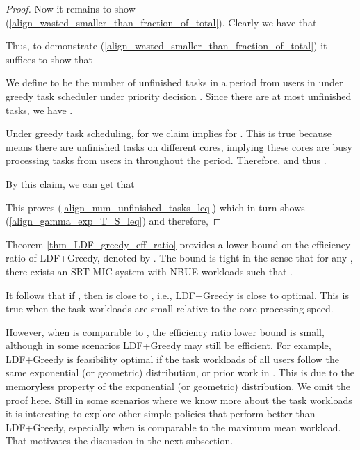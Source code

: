 \documentclass[prodmode,acmtompecs]{acmsmall}
\newcommand{\myComments}[1]{}
\newif\ifinfocom
\newif\iftompecs
\newif\ifdissertation
\newcommand{\infocomStart}{\ifinfocom \myComments{Infocom: }}
\newcommand{\tompecsStart}{\iftompecs \myComments{TOMPECS version: }}
\newcommand{\dissertationStart}{\ifdissertation  \myComments{Dissertation version: }}
\newcommand{\commentEnd}{\myComments{End}}
\begin{document}
\begin{proof}
Now it remains to show (\ref{align_wasted_smaller_than_fraction_of_total}). 
Clearly we have that

Thus, to demonstrate (\ref{align_wasted_smaller_than_fraction_of_total}) it suffices to show that



We define  to be the number of unfinished tasks in a period from users in  under greedy task scheduler under priority decision . Since there are at most  unfinished tasks, we have . 

Under greedy task scheduling, for  we claim  implies  for . This is true because  means there are  unfinished tasks on  different cores, implying these  cores are busy processing tasks from users in  throughout the period.
Therefore,  and thus . 


By this claim, we can get that



This proves 
(\ref{align_num_unfinished_tasks_leq}) 
which in turn shows (\ref{align_gamma_exp_T_S_leq}) and therefore,


\end{proof}
\commentEnd\fi

Theorem \ref{thm_LDF_greedy_eff_ratio} provides a lower bound on the efficiency ratio of LDF+Greedy, denoted by . The bound is tight in the sense that for any , there exists an SRT-MIC  system with NBUE workloads such that . 
\infocomStart
Such a system is also detailed in \cite{EXT}. 
\commentEnd\fi
\tompecsStart
Such a system is detailed in Appendix \ref{appendix_example_showing_theorem_LDF_Greedy_eff_ratio_is_tight}. 
\commentEnd\fi

\dissertationStart
Intuitively,  represents the worst case ratio of wasted resources (core time)  under LDF+Greedy to the total available resources . 
\commentEnd\fi

It follows that if , then  is close to , i.e., LDF+Greedy is close to optimal. This is true when the task workloads are small relative to the core processing speed. 

However, when  is comparable to , the efficiency ratio lower bound  is small, 
although in some scenarios LDF+Greedy may still be efficient. For example, LDF+Greedy is feasibility optimal if the task workloads of all users follow the same exponential (or geometric) distribution, 
or prior work in \cite{HoK12}. 
This is due to the memoryless property of the exponential (or geometric) distribution. 
We omit the proof here. 
Still in some scenarios where we know more about the task workloads it is interesting to explore other simple policies that perform better than LDF+Greedy, especially when  is comparable to the maximum mean workload. That motivates the discussion in the next subsection. 
\end{document}
